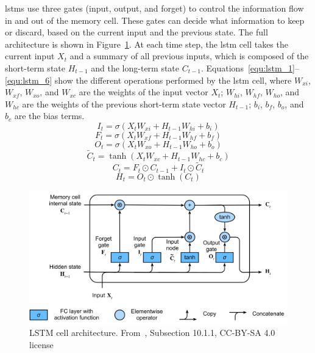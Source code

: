 \acrshort{lstm}s use three gates (input, output, and forget) to control the information flow in and out of the memory cell. These gates can decide what information to keep or discard, based on the current input and the previous state. The full architecture is shown in Figure~\ref{fig:lstm_architecture}. At each time step, the \acrshort{lstm} cell takes the current input \(X_t\) and a summary of all previous inputs, which is composed of the short-term state \(H_{t-1}\) and the long-term state \(C_{t-1}\). Equations~\eqref{equ:lstm_1}--\eqref{equ:lstm_6} show the different operations performed by the \acrshort{lstm} cell, where \(W_{xi}\), \(W_{xf}\), \(W_{xo}\), and \(W_{xc}\) are the weights of the input vector \(X_t\); \(W_{hi}\), \(W_{hf}\), \(W_{ho}\), and \(W_{hc}\) are the weights of the previous short-term state vector \(H_{t-1}\); \(b_i\), \(b_f\), \(b_o\), and \(b_c\) are the bias terms.
\begin{equation}\label{equ:lstm_1}
  I_t = \sigma(X_{t}W_{xi} + H_{t-1}W_{hi} + b_{i})
\end{equation}
\begin{equation}\label{equ:lstm_2}
  F_t = \sigma(X_{t}W_{xf} + H_{t-1}W_{hf} + b_{f})
\end{equation}
\begin{equation}\label{equ:lstm_4}
  O_t = \sigma(X_{t}W_{xo} + H_{t-1}W_{ho} + b_{o})
\end{equation}
\begin{equation}\label{equ:lstm_3}
  \tilde{C}_t = \tanh(X_{t}W_{xc} + H_{t-1}W_{hc} + b_{c})
\end{equation}
\begin{equation}\label{equ:lstm_5}
  C_t = F_t \odot C_{t-1} + I_t \odot \tilde{C}_t
\end{equation}
\begin{equation}\label{equ:lstm_6}
  H_t = O_t \odot \tanh(C_t)
\end{equation}

\begin{figure}
  \centering
  \includegraphics[width=.8\linewidth]{images/modes_clustering/lstm.png}
  \caption[LSTM cell architecture]{LSTM cell architecture. From~\textcite{zhangDiveDeepLearning2023}, Subsection 10.1.1, CC-BY-SA 4.0 license}%
  \label{fig:lstm_architecture}
\end{figure}

